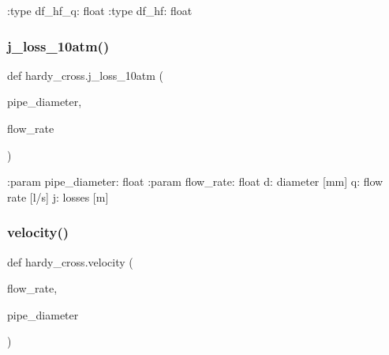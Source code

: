 \begin{DoxyVerb}:type df_hf_q: float
:type df_hf: float
\end{DoxyVerb}
 \mbox{\label{namespacehardy__cross_aecaab5e3707cd3259ad7d21ff2fccbdd}} 
\subsubsection{j\+\_\+loss\+\_\+10atm()}
{\footnotesize\ttfamily def hardy\+\_\+cross.\+j\+\_\+loss\+\_\+10atm (\begin{DoxyParamCaption}\item[{}]{pipe\+\_\+diameter,  }\item[{}]{flow\+\_\+rate }\end{DoxyParamCaption})}

\begin{DoxyVerb}:param pipe_diameter: float
:param flow_rate: float
d: diameter [mm]
q: flow rate [l/s]
j: losses [m]
\end{DoxyVerb}
 \mbox{\label{namespacehardy__cross_a10c727ef7f7495f725c8d31d97d70ade}} 
\subsubsection{velocity()}
{\footnotesize\ttfamily def hardy\+\_\+cross.\+velocity (\begin{DoxyParamCaption}\item[{}]{flow\+\_\+rate,  }\item[{}]{pipe\+\_\+diameter }\end{DoxyParamCaption})}

